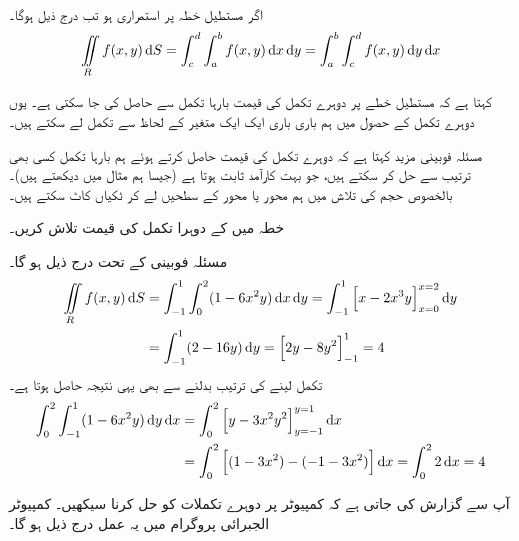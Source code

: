 \\
 اگر مستطیل خطہ  پر  استمراری ہو تب درج ذیل ہوگا۔
\begin{align*}
\iint\limits_Rf(x,y)\dif S=\int_c^d\int_a^bf(x,y)\dif x\dif y=\int_a^b\int_c^d f(x,y)\dif y\dif x
\end{align*}



 کہتا ہے کہ مستطیل خطے  پر  دوہرے تکمل کی قیمت   بارہا تکمل سے حاصل کی جا سکتی ہے۔ یوں دوہرے  تکمل کے حصول میں ہم باری باری   ایک ایک متغیر کے لحاظ سے تکمل لے سکتے ہیں۔

مسئلہ فوبینی مزید کہتا ہے کہ  دوہرے تکمل کی قیمت حاصل کرتے ہوئے ہم بارہا تکمل کسی بھی ترتیب سے حل کر سکتے ہیں، جو بہت کارآمد ثابت ہوتا ہے (جیسا ہم   مثال  میں دیکھتے ہیں)۔بالخصوص حجم کی تلاش میں ہم محور  یا محور  کے   سطحیں لے کر ٹکیاں کاٹ سکتے ہیں۔

خطہ  میں  کے دوہرا تکمل   کی قیمت تلاش کریں۔

مسئلہ فوبینی کے تحت درج ذیل ہو گا۔
\begin{align*}
\iint\limits_R f(x,y)\dif S&=\int_{-1}^1 \int_0^2(1-6x^2y)\dif x\dif y=\int_{-1}^1 \left[x-2x^3y\right]_{x=0}^{x=2}\dif y\\
&=\int_{-1}^1 (2-16y)\dif y=\left[2y-8y^2\right]_{-1}^1=4
\end{align*}
تکمل  لینے کی ترتیب بدلنے سے بھی یہی نتیجہ حاصل ہوتا ہے۔
\begin{align*}
\int_0^2\int_{-1}^1 (1-6x^2y)\dif y\dif x&=\int_0^2 \left[y-3x^2y^2\right]_{y=-1}^{y=1}\dif x\\
&=\int_0^2\left[(1-3x^2)-(-1-3x^2)\right]\dif x=\int_0^2 2\dif x=4
\end{align*}

آپ سے گزارش کی جاتی ہے کہ کمپیوٹر پر دوہرے  تکملات  کو حل کرنا سیکھیں۔ کمپیوٹر الجبرائی   پروگرام   میں یہ عمل درج ذیل ہو گا۔
\begin{center}
\end{center}



